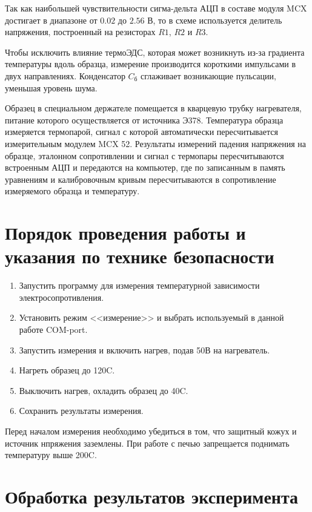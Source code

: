 Так как наибольшей чувствительности сигма-дельта АЦП в составе модуля MCX достигает в диапазоне от $0.02$ до $2.56$ В, то в схеме используется делитель напряжения, построенный на резисторах $R1$, $R2$ и $R3$.

Чтобы исключить влияние термоЭДС, которая может возникнуть из-за градиента температуры вдоль образца, измерение производится короткими импульсами в двух направлениях. Конденсатор $C_{\text{б}}$ сглаживает возникающие пульсации, уменьшая уровень шума.

Образец в специальном держателе помещается в кварцевую трубку нагревателя, питание которого осуществляется от источника Э378. Температура образца измеряется термопарой, сигнал с которой автоматически пересчитывается измерительным модулем MCX 52. Результаты измерений падения напряжения на образце, эталонном сопротивлении и сигнал с термопары пересчитываются встроенным АЦП и передаются на компьютер, где по записанным в память уравнениям и калибровочным кривым пересчитываются в сопротивление измеряемого образца и температуру.

\section{Порядок проведения работы и указания по технике безопасности}

\begin{enumerate}
\item Запустить программу для измерения температурной зависимости электросопротивления.
\item Установить режим <<измерение>> и выбрать используемый в данной работе COM-port.
\item Запустить измерения и включить нагрев, подав 50В на нагреватель.
\item Нагреть образец до 120\textdegree C.
\item Выключить нагрев, охладить образец до 40\textdegree C.
\item Сохранить результаты измерения.
\end{enumerate}

Перед началом измерения необходимо убедиться в том, что защитный кожух и источник нпряжения заземлены. При работе с печью запрещается поднимать температуру выше 200\textdegree C.

\section{Обработка результатов эксперимента}

